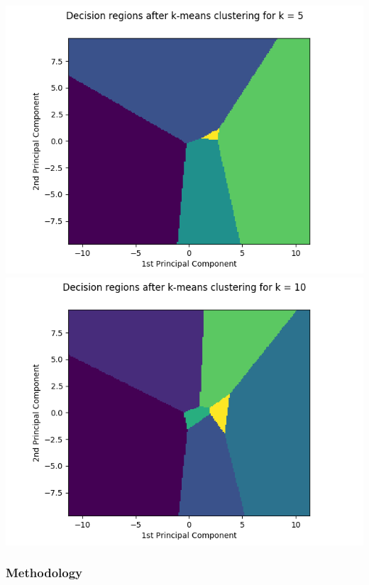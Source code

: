 \documentclass{article}
\begin{document}
\begin{center}
    \includegraphics[trim=3cm 0 3cm 0, scale=0.5]{images/task1_7_5.png}
    \vspace{0.5cm}
    \includegraphics[scale=0.5]{images/task1_7_10.png}
\end{center}

\newpage
\subsubsection*{Methodology}
\renewcommand{\vec}[1]{\mathbf{#1}}
\end{document}
